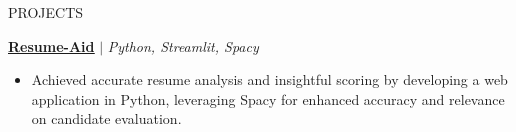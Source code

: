 \documentclass{resume} %
\begin{document}
\begin{rSection}{PROJECTS}
\vspace{0.05em}

\href{https://github.com/RutvikJ77/Resume-aid}{\textbf{\underline{Resume-Aid}}} $|$\textit{ Python, Streamlit, Spacy}
\begin{itemize}
    \item Achieved accurate resume analysis and insightful scoring by developing a web application in Python, leveraging Spacy for enhanced accuracy and relevance on candidate evaluation.
\end{itemize}





\end{rSection}
\end{document}
